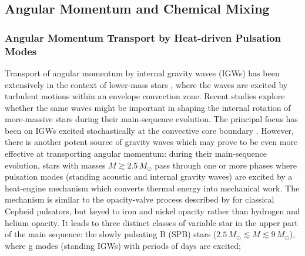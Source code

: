 
\subsection{Angular Momentum and Chemical Mixing}

\subsubsection{Angular Momentum Transport by Heat-driven Pulsation Modes}

Transport of angular momentum by internal gravity waves (IGWs) has been extensively in the context of lower-mass stars  \citep[e.g.,][]{Schatzman:1993,Kumar:1997,Zahn:1997,Talon:2002,Talon:2005,Rogers:2008}, where the waves are excited by turbulent motions within an envelope convection zone. Recent studies explore whether the same waves might be important in shaping the internal rotation of more-massive stars during their main-sequence evolution. The principal focus has been on IGWs excited stochastically at the convective core boundary \citep[e.g.][]{Rogers:2013,Lee:2014,Rogers:2015}. However, there is another potent source of gravity waves which may prove to be even more effective at transporting angular momentum: during their main-sequence evolution, stars with masses $M \gtrsim 2.5\,M_{\odot}$ pass through one or more phases where pulsation modes (standing acoustic and internal gravity waves) are excited by a heat-engine mechanism which converts thermal energy into mechanical work. The mechanism is similar to the opacity-valve process described by \citet{Eddington:1926} for classical Cepheid pulsators, but keyed to iron and nickel opacity rather than hydrogen and helium opacity. It leads to three distinct classes of variable star in the upper part of the main sequence: the slowly pulsating B (SPB) stars ($2.5\,M_{\odot} \lesssim M \lesssim 9\,M_{\odot}$), where g modes (standing IGWs) with periods of days are excited; 

